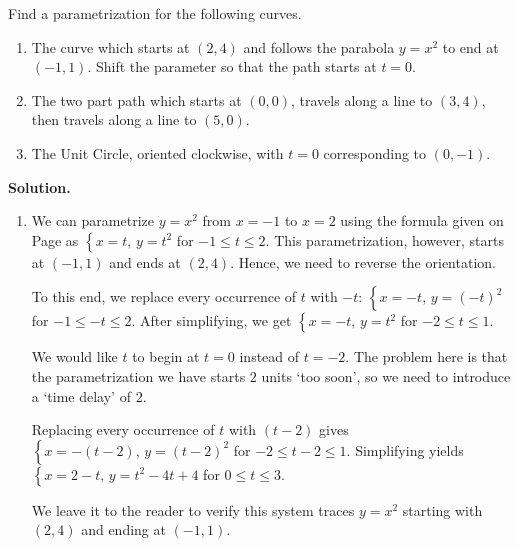 \begin{ex} \label{adjustparametricex}  Find a parametrization for the following curves.

\begin{enumerate}

\item The curve which starts at $(2,4)$ and follows the parabola $y = x^2$ to end at $(-1,1)$.  Shift the parameter so that the path starts at $t=0$.

\item The two part path which starts at $(0,0)$, travels along a line to $(3,4)$, then travels along a line to $(5,0)$. 

\item  \label{adjustcircleex} The Unit Circle, oriented clockwise, with $t=0$ corresponding to $(0,-1)$.


\end{enumerate}

{\bf Solution.}  $~$

\begin{enumerate}

\item  We can parametrize $y = x^2$ from $x=-1$ to $x=2$ using the formula given on Page \pageref{commonparametrizations} as $\left\{x = t, \, y = t^2 \right.$ for $-1 \leq t \leq 2$.  This parametrization, however, starts at $(-1,1)$ and ends at $(2,4)$.  Hence, we need to reverse the orientation. 

\smallskip

To this end, we replace every occurrence of $t$ with $-t$:  $\left\{x = -t, \, y = (-t)^2 \right.$ for $-1 \leq -t \leq 2$.  After simplifying, we get  $\left\{x = -t, \, y = t^2 \right.$ for $-2 \leq t \leq 1$. 

\smallskip

 We would like $t$ to begin at $t=0$ instead of $t=-2$. The problem here is that the parametrization we have  starts $2$ units `too soon', so we need to introduce a `time delay' of $2$.  
 
 \smallskip
 
 Replacing every occurrence of $t$ with $(t-2)$ gives $\left\{x = -(t-2), \, y =(t-2) ^2 \right.$ for  $-2 \leq t -2 \leq 1$.  Simplifying yields $\left\{x = 2-t, \, y =t^2-4t+4\right.$ for $0 \leq t  \leq 3$.
 
 \smallskip
 
 We leave it to the reader to verify this system traces $y = x^2$ starting with $(2,4)$ and ending at $(-1,1)$.


\end{enumerate}
\end{ex}
